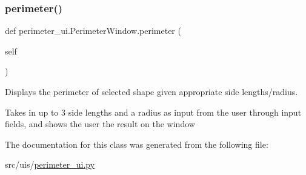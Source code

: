 \subsubsection{\texorpdfstring{perimeter()}{perimeter()}}
{\footnotesize\ttfamily def perimeter\+\_\+ui.\+Perimeter\+Window.\+perimeter (\begin{DoxyParamCaption}\item[{}]{self }\end{DoxyParamCaption})}



Displays the perimeter of selected shape given appropriate side lengths/radius. 

Takes in up to 3 side lengths and a radius as input from the user through input fields, and shows the user the result on the window 

The documentation for this class was generated from the following file\+:\begin{DoxyCompactItemize}
\item 
src/uis/\hyperlink{perimeter__ui_8py}{perimeter\+\_\+ui.\+py}\end{DoxyCompactItemize}
